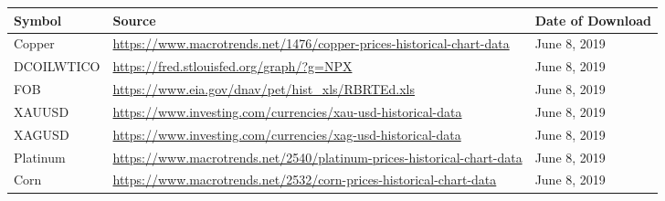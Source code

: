 \documentclass[12pt, a4paper]{article}
\begin{document}
        \begin{table}[H]
    \centering
        \begin{tabular}{p{3.0cm} p{10.0cm}l}
        \hline
        \textbf{Symbol}                                                             & \textbf{Source}                                                                                                                                              & \textbf{Date of Download} \\ \hline
        
       Copper                                                                      & \url{https://www.macrotrends.net/1476/copper-prices-historical-chart-data}                                                                  & June 8, 2019              \\
        DCOILWTICO                                                                  & \url{https://fred.stlouisfed.org/graph/?g=NPX}                                                                                              & June 8, 2019              \\
        FOB                                                                         & \url{https://www.eia.gov/dnav/pet/hist\_xls/RBRTEd.xls}                                                                                     & June 8, 2019              \\
        XAUUSD                                                                      & \url{https://www.investing.com/currencies/xau-usd-historical-data}                                                                          & June 8, 2019              \\
        XAGUSD                                                                      & \url{https://www.investing.com/currencies/xag-usd-historical-data}                                                                          & June 8, 2019              \\
        Platinum                                                                    & \url{https://www.macrotrends.net/2540/platinum-prices-historical-chart-data}                                                                & June 8, 2019              \\
        Corn                                                                        & \url{https://www.macrotrends.net/2532/corn-prices-historical-chart-data}                                                                    & June 8, 2019              \\

\end{tabular}
\end{table}
\end{document}
